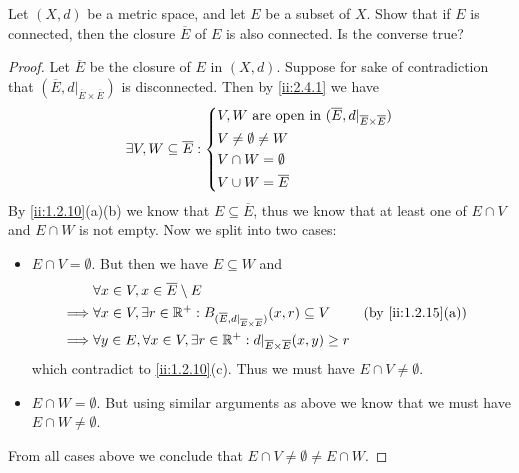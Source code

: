 \begin{ex}\label{ii:ex:2.4.8}
  Let \((X, d)\) be a metric space, and let \(E\) be a subset of \(X\).
  Show that if \(E\) is connected, then the closure \(\overline{E}\) of \(E\) is also connected.
  Is the converse true?
\end{ex}

\begin{proof}
  Let \(\overline{E}\) be the closure of \(E\) in \((X, d)\).
  Suppose for sake of contradiction that \((\overline{E}, d|_{\overline{E} \times \overline{E}})\) is disconnected.
  Then by \cref{ii:2.4.1} we have
  \[
    \exists V, W \subseteq \overline{E} : \begin{dcases}
      V, W \text{ are open in } (\overline{E}, d|_{\overline{E} \times \overline{E}}) \\
      V \neq \emptyset \neq W                                                         \\
      V \cap W = \emptyset                                                            \\
      V \cup W = \overline{E}
    \end{dcases}
  \]
  By \cref{ii:1.2.10}(a)(b) we know that \(E \subseteq \overline{E}\), thus we know that at least one of \(E \cap V\) and \(E \cap W\) is not empty.
  Now we split into two cases:
  \begin{itemize}
    \item \(E \cap V = \emptyset\).
          But then we have \(E \subseteq W\) and
          \begin{align*}
                     & \forall x \in V, x \in \overline{E} \setminus E                                                                                          \\
            \implies & \forall x \in V, \exists r \in \R^+ : B_{(\overline{E}, d|_{\overline{E} \times \overline{E}})}(x, r) \subseteq V &  & \by{ii:1.2.15}[a] \\
            \implies & \forall y \in E, \forall x \in V, \exists r \in \R^+ : d|_{\overline{E} \times \overline{E}}(x, y) \geq r
          \end{align*}
          which contradict to \cref{ii:1.2.10}(c).
          Thus we must have \(E \cap V \neq \emptyset\).
    \item \(E \cap W = \emptyset\).
          But using similar arguments as above we know that we must have \(E \cap W \neq \emptyset\).
  \end{itemize}
  From all cases above we conclude that \(E \cap V \neq \emptyset \neq E \cap W\).

\end{proof}
